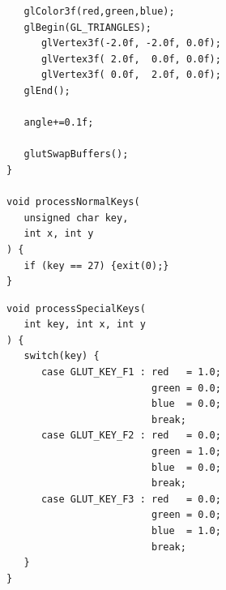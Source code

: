 \begin{frame}[fragile]
%
%
\begin{codebox}
\begin{verbatim}
   glColor3f(red,green,blue);
   glBegin(GL_TRIANGLES);
      glVertex3f(-2.0f, -2.0f, 0.0f);
      glVertex3f( 2.0f,  0.0f, 0.0f);
      glVertex3f( 0.0f,  2.0f, 0.0f);
   glEnd();

   angle+=0.1f;

   glutSwapBuffers();
}

void processNormalKeys(
   unsigned char key, 
   int x, int y
) {
   if (key == 27) {exit(0);}
}
\end{verbatim}
\end{codebox}
%
\begin{codebox}
\begin{verbatim}
void processSpecialKeys(
   int key, int x, int y
) {
   switch(key) {
      case GLUT_KEY_F1 : red   = 1.0;
                         green = 0.0;
                         blue  = 0.0; 
                         break;
      case GLUT_KEY_F2 : red   = 0.0;
                         green = 1.0;
                         blue  = 0.0; 
                         break;
      case GLUT_KEY_F3 : red   = 0.0;
                         green = 0.0;
                         blue  = 1.0; 
                         break;
   }
}
\end{verbatim}
\end{codebox}
%
\end{frame}


